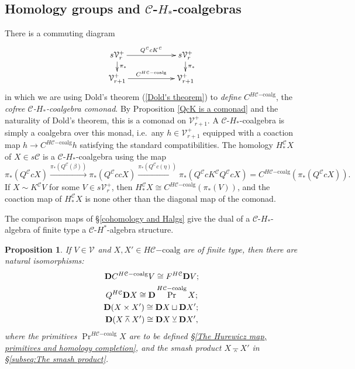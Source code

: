 \documentclass[11pt]{amsart} \renewcommand{\baselinestretch}{1.2}
\theoremstyle{plain}
\newtheorem{prop}[thm]{Proposition}
\theoremstyle{definition}
\DeclareMathOperator{\Prim}{Pr}
\renewcommand{\to}{\longrightarrow}
\newcommand{\calV}{\mathcal{V}}
\newcommand{\calc}{\mathcal{C}}
\newcommand{\vect}[2]{\calV^{#1}_{#2}}
\newcommand{\HA}[1]{H#1}
\newcommand{\HC}[1]{H#1\mathrm{-coalg}}
\newcommand{\dual}{\mathbf{D}}
\newcommand{\smashprod}{\barwedge}%
\newcommand{\smashcoprod}{\veebar}%
\begin{document}
\begin{Pi-algebras and cohomology algebras}
\subsection{Homology groups and $\calc$-$H_*$-coalgebras}\label{homology and Hcoalgs}
There is a commuting diagram
\[\xymatrix@R=4mm@C=20mm{
s\vect{+}{r}\ar[r]^-{Q^\calc cK^\calc }
\ar[d]^-{\pi_*}
&%
s\vect{+}{r}\ar[d]^-{\pi_*}
\\%
\vect{+}{r+1}\ar[r]^-{C^{\HC{\calc}}}
&
\vect{+}{r+1}
}\]
in which we are using Dold's theorem (\ref{Dold's theorem}) to \emph{define} $C^{\HC{\calc}}$, the \emph{cofree $\calc$-$H_*$-coalgebra comonad}.
By Proposition \ref{QcK is a comonad} and the naturality of Dold's theorem, this is a comonad on $\vect{+}{r+1}$. A $\calc$-$H_*$-coalgebra is simply a coalgebra over this monad, i.e.\ any $h\in\vect{+}{r+1}$ equipped with a coaction map $h\to C^{\HC{\calc}}h$ satisfying the standard compatibilities. The homology $H_*^\calc X$ of $X\in s\calc$ is a $\calc$-$H_*$-coalgebra using the map
\[\pi_*(Q^{\calc}cX)\overset{\pi_*(Q^{\calc}(\beta))}{\to}\pi_*(Q^{\calc}ccX)\overset{\pi_*(Q^{\calc}c(\eta))}{\to}\pi_*(Q^{\calc}cK^{\calc}Q^{\calc}cX)=C^{\HC{\calc}}(\pi_*(Q^{\calc}cX)).\]
If $X\sim K^{\calc}V$ for some $V\in s\vect{+}{r}$, then $H_*^{\calc}X\cong C^{\HC{\calc}}(\pi_*(V))$, and the coaction map of $H_*^{\calc}X$ is none other than the diagonal map of the comonad.

The comparison maps of \S\ref{cohomology and Halgs} give the dual of a $\calc$-$H_*$-algebra of finite type a $\calc$-$H^*$-algebra structure. 
\begin{prop}
\label{something about dualization}
If $V\in \vect{}{}$ and $X,X'\in \HC{\calc}$ are of finite type, then there are natural isomorphisms:
\begin{gather*}
\dual C^{\HC{\calc}}V\cong F^{\HA{\calc}}\dual V;\\
Q^{\HA{\calc}}\dual X\cong \dual \Prim^{\HC{\calc}} X;\\
\dual(X\times X')\cong \dual X\sqcup \dual X';\makebox[0cm][l]{}\\
\dual(X\smashprod X')\cong \dual X\smashcoprod \dual X',
\end{gather*}
where the primitives $\Prim^{\HC{\calc}}X$ are to be defined \S\ref{The Hurewicz map, primitives and homology completion}, and the smash product $X\smashprod X'$ in \S\ref{subseq:The smash product}.
\end{prop}

\end{Pi-algebras and cohomology algebras}
\end{document}
